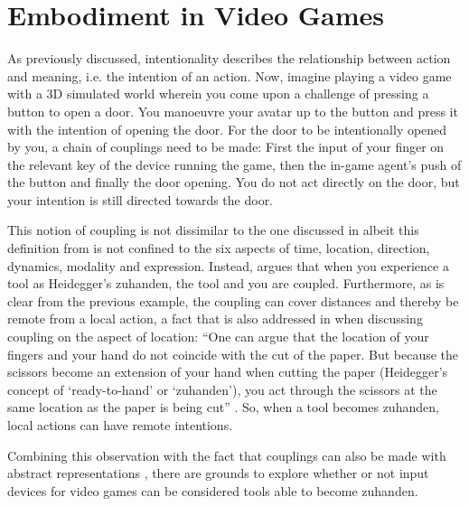 \section{Embodiment in Video Games}
As previously discussed, intentionality describes the relationship between action and meaning, i.e. the intention of an action. Now, imagine playing a video game with a 3D simulated world wherein you come upon a challenge of pressing a button to open a door. You manoeuvre your avatar up to the button and press it with the intention of opening the door. For the door to be intentionally opened by you, a chain of couplings \cite{dourish} need to be made: First the input of your finger on the relevant key of the device running the game, then the in-game agent's push of the button and finally the door opening. You do not act directly on the door, but your intention is still directed towards the door.

This notion of coupling is not dissimilar to the one discussed in  albeit this definition from  is not confined to the six aspects of time, location, direction, dynamics, modality and expression. Instead,  argues that when you experience a tool as Heidegger's zuhanden, the tool and you are coupled. Furthermore, as is clear from the previous example, the coupling can cover distances and thereby be remote from a local action, a fact that is also addressed in  when discussing coupling on the aspect of location: ``One can argue that the location of your fingers and your hand do not coincide with the cut of the paper. But because the scissors become an extension of your hand when cutting the paper (Heidegger’s concept of ‘ready-to-hand’ or ‘zuhanden’), you act through the scissors at the same location as the paper is being cut'' \cite[p. 2]{frogger}. So, when a tool becomes zuhanden, local actions can have remote intentions.

Combining this observation with the fact that couplings can also be made with abstract representations \cite{dourish}, there are grounds to explore whether or not input devices for video games can be considered tools able to become zuhanden.

